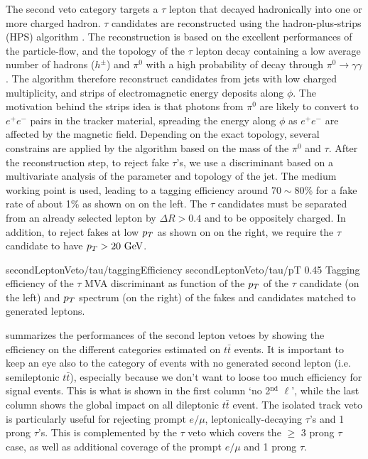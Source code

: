     The second veto category targets a $\tau$ lepton that decayed hadronically
    into one or more charged hadron. $\tau$ candidates are reconstructed using the
    hadron-plus-strips (HPS) algorithm \cite{TauID}. The reconstruction is based on the excellent
    performances of the particle-flow, and the topology of the $\tau$ lepton decay containing
    a low average number of hadrons ($h^\pm$) and $\pi^0$ with a high probability of decay
    through $\pi^0 \rightarrow \gamma\gamma$. The algorithm therefore reconstruct candidates
    from jets with low charged multiplicity, and strips of electromagnetic energy
    deposits along $\phi$. The motivation behind the strips idea is that photons from $\pi^0$
    are likely to convert to $e^+e^-$ pairs in the tracker material, spreading the energy
    along $\phi$ as $e^+e^-$ are affected by the magnetic field. Depending on the exact topology,
    several constrains are applied by the algorithm based on the mass of the $\pi^0$ and
    $\tau$. After the reconstruction step, to reject fake $\tau$'s, we use a discriminant
    based on a multivariate analysis of the parameter and topology of the jet. The medium
    working point is used, leading to a tagging efficiency around $70\sim80$\% for a fake
    rate of about 1\% as shown on  on the left. The $\tau$
    candidates must be separated from an already selected lepton by $\Delta R > 0.4$ and
    to be oppositely charged. In addition, to reject fakes at low $p_T$ as shown on
     on the right, we require the $\tau$ candidate to have
    $p_T > 20~\text{GeV}$.

                     {secondLeptonVeto/tau/taggingEfficiency}
                     {secondLeptonVeto/tau/pT}
                     {0.45}
                     {Tagging efficiency of the $\tau$ MVA discriminant as function of the
                     $p_T$ of the $\tau$ candidate (on the left) and $p_T$ spectrum (on the
                     right) of the fakes and candidates matched to generated leptons.}

     summarizes the performances of the
    second lepton vetoes by showing the efficiency on the different categories estimated on
    $t\bar{t}$ events. It is important to keep an eye also to the category of events with no
    generated second lepton (i.e. semileptonic $t\bar{t}$), especially because we don't
    want to loose too much efficiency for signal events. This is what is shown in the first
    column `no 2$^\text{nd}$ $\ell$', while the last column shows the global impact on all
    dileptonic $t\bar{t}$ event. The isolated track veto is particularly useful for rejecting
    prompt $e/\mu$, leptonically-decaying $\tau$'s and 1 prong $\tau$'s. This is complemented
    by the $\tau$ veto which covers the $\geq$ 3 prong $\tau$ case, as well as additional
    coverage of the prompt $e/\mu$ and 1 prong $\tau$.

